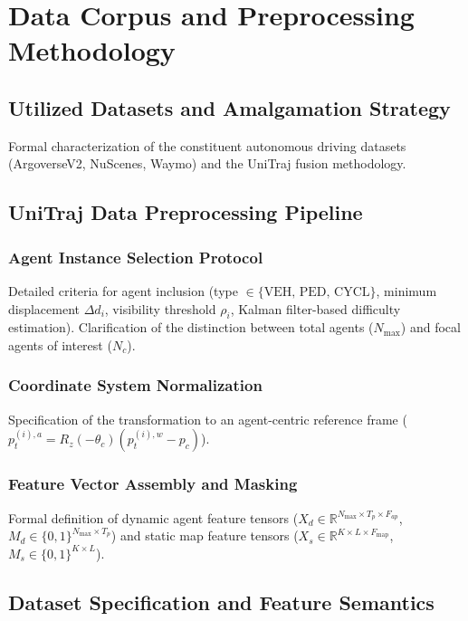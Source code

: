 
\chapter{Data Corpus and Preprocessing Methodology}
\label{ch:data_methodology}

\section{Utilized Datasets and Amalgamation Strategy}
\label{sec:data_datasets}
Formal characterization of the constituent autonomous driving datasets (ArgoverseV2, NuScenes, Waymo) and the UniTraj fusion methodology.

\section{UniTraj Data Preprocessing Pipeline}
\label{sec:data_pipeline}
    \subsection{Agent Instance Selection Protocol}
    Detailed criteria for agent inclusion (type $\in \{\text{VEH, PED, CYCL}\}$, minimum displacement $\Delta d_{i}$, visibility threshold $\rho_{i}$, Kalman filter-based difficulty estimation). Clarification of the distinction between total agents ($N_{\text{max}}$) and focal agents of interest ($N_{c}$).
    \subsection{Coordinate System Normalization}
    Specification of the transformation to an agent-centric reference frame ($p_{t}^{(i),a}=R_{z}(-\theta_{c})(p_{t}^{(i),w}-p_{c})$).
    \subsection{Feature Vector Assembly and Masking}
    Formal definition of dynamic agent feature tensors ($X_{d}\in\mathbb{R}^{N_{\text{max}}\times T_{p}\times F_{ap}}$, $M_{d}\in\{0,1\}^{N_{\text{max}}\times T_{p}}$) and static map feature tensors ($X_{s}\in\mathbb{R}^{K\times L\times F_{\text{map}}}$, $M_{s}\in\{0,1\}^{K\times L}$).

\section{Dataset Specification and Feature Semantics}
\label{sec:data_datasetitem}
